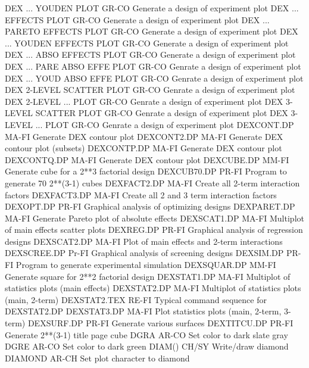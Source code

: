 DEX ... YOUDEN PLOT         GR-CO Generate a design of experiment plot
DEX ... EFFECTS PLOT        GR-CO Generate a design of experiment plot
DEX ... PARETO EFFECTS PLOT GR-CO Generate a design of experiment plot
DEX ... YOUDEN EFFECTS PLOT GR-CO Generate a design of experiment plot
DEX ... ABSO EFFECTS PLOT   GR-CO Generate a design of experiment plot
DEX ... PARE ABSO EFFE PLOT GR-CO Genrate a design of experiment plot
DEX ... YOUD ABSO EFFE PLOT GR-CO Genrate a design of experiment plot
DEX 2-LEVEL SCATTER PLOT    GR-CO Genrate a design of experiment plot
DEX 2-LEVEL ... PLOT        GR-CO Genrate a design of experiment plot
DEX 3-LEVEL SCATTER PLOT    GR-CO Genrate a design of experiment plot
DEX 3-LEVEL ... PLOT        GR-CO Genrate a design of experiment plot
DEXCONT.DP                  MA-FI Generate DEX contour plot
DEXCONT2.DP                 MA-FI Generate DEX contour plot (subsets)
DEXCONTP.DP                 MA-FI Generate DEX contour plot
DEXCONTQ.DP                 MA-FI Generate DEX contour plot
DEXCUBE.DP                  MM-FI Generate cube for a 2**3 factorial design
DEXCUB70.DP                 PR-FI Program to generate 70 2**(3-1) cubes
DEXFACT2.DP                 MA-FI Create all 2-term interaction factors
DEXFACT3.DP                 MA-FI Create all 2 and 3 term interaction factors
DEXOPT.DP                   PR-FI Graphical analysis of optimizing designs
DEXPARET.DP                 MA-FI Generate Pareto plot of absolute effects
DEXSCAT1.DP                 MA-FI Multiplot of main effects scatter plots
DEXREG.DP                   PR-FI Graphical analysis of regression designs
DEXSCAT2.DP                 MA-FI Plot of main effects and 2-term interactions
DEXSCREE.DP                 Pr-FI Graphical analysis of screening designs
DEXSIM.DP                   PR-FI Program to generate experimental simulation
DEXSQUAR.DP                 MM-FI Generate square for 2**2 factorial design
DEXSTAT1.DP                 MA-FI Multiplot of statistics plots (main effects)
DEXSTAT2.DP                 MA-FI Multiplot of statistics plots (main, 2-term)
DEXSTAT2.TEX                RE-FI Typical command sequence for DEXSTAT2.DP
DEXSTAT3.DP                 MA-FI Plot statistics plots (main, 2-term, 3-term)
DEXSURF.DP                  PR-FI Generate various surfaces 
DEXTITCU.DP                 PR-FI Generate 2**(3-1) title page cube
DGRA                        AR-CO Set color to dark slate gray
DGRE                        AR-CO Set color to dark green
DIAM()                      CH/SY Write/draw diamond
DIAMOND                     AR-CH Set plot character to diamond
